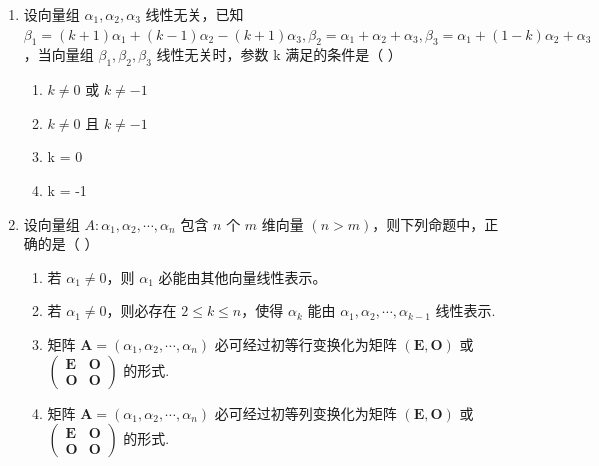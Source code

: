 \documentclass[12pt, a4paper]{ctexart}
\begin{document}
\begin{enumerate}
    \item 设向量组 $ \alpha_{1},\alpha_{2},\alpha_{3} $ 线性无关，已知 $ \beta_{1}=(k+1)\alpha_{1}+(k-1)\alpha_{2}-(k+1)\alpha_{3},\beta_{2}=\alpha_{1}+ \alpha_{2}+\alpha_{3},\beta_{3}=\alpha_{1}+(1-k)\alpha_{2}+\alpha_{3} $，当向量组 $ \beta_{1},\beta_{2},\beta_{3} $ 线性无关时，参数 k 满足的条件是（ \underline{\hspace{1cm}} ）
    \begin{enumerate}[label=(\Alph*)]
        \item $ k \neq 0 $ 或 $ k \neq -1 $
        \item $ k \neq 0 $ 且 $ k \neq -1 $
        \item k = 0
        \item k = -1
    \end{enumerate}

    \item 设向量组 $ A: \alpha_1, \alpha_2, \cdots, \alpha_n $ 包含 $ n $ 个 $ m $ 维向量 $ (n > m) $，则下列命题中，正确的是（ \underline{\hspace{1cm}} ）
    \begin{enumerate}[label=(\Alph*)]
        \item 若 $ \alpha_1 \neq 0 $，则 $ \alpha_1 $ 必能由其他向量线性表示。
        \item 若 $ \alpha_{1} \neq 0 $，则必存在 $ 2 \leq k \leq n $，使得 $ \alpha_{k} $ 能由 $ \alpha_{1}, \alpha_{2}, \cdots, \alpha_{k-1} $ 线性表示.
        \item 矩阵 $ \mathbf{A} = (\alpha_1, \alpha_2, \cdots, \alpha_n) $ 必可经过初等行变换化为矩阵 $ \left(\mathbf{E}, \mathbf{O}\right) $ 或 $ \begin{pmatrix} \mathbf{E} & \mathbf{O} \\ \mathbf{O} & \mathbf{O} \end{pmatrix} $ 的形式.
        \item 矩阵 $ \mathbf{A} = (\alpha_1, \alpha_2, \cdots, \alpha_n) $ 必可经过初等列变换化为矩阵 $ \left(\mathbf{E}, \mathbf{O}\right) $ 或 $ \begin{pmatrix} \mathbf{E} & \mathbf{O} \\ \mathbf{O} & \mathbf{O} \end{pmatrix} $ 的形式.
    \end{enumerate}


\end{enumerate}
\end{document}
